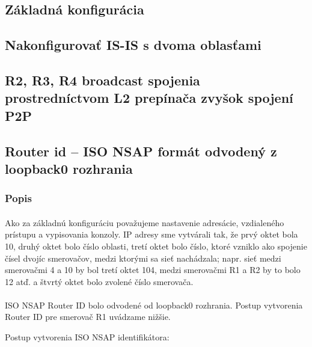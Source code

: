 \documentclass[12pt,twoside,a4paper]{report}
\begin{document}
\subsection{Základná konfigurácia}
\subsection{Nakonfigurovať IS-IS s dvoma oblasťami}
\subsection{R2, R3, R4 broadcast spojenia prostredníctvom L2 prepínača zvyšok spojení P2P}
\subsection{Router id – ISO NSAP formát odvodený z loopback0 rozhrania}
\subsubsection{Popis}
\paragraph{}
Ako za základnú konfiguráciu považujeme nastavenie adresácie, vzdialeného prístupu a vypisovania konzoly. IP adresy sme vytvárali tak, že prvý oktet bola 10, druhý oktet bolo číslo oblasti, tretí oktet bolo číslo, ktoré vzniklo ako spojenie čísel dvojíc smerovačov, medzi ktorými sa sieť nachádzala; napr. sieť medzi smerovačmi 4 a 10 by bol tretí oktet 104, medzi smerovačmi R1 a R2 by to bolo 12 atď. a štvrtý oktet bolo zvolené číslo smerovača.

\paragraph{}
ISO NSAP Router ID bolo odvodené od loopback0 rozhrania. Postup vytvorenia Router ID pre smerovač R1 uvádzame nižšie.

Postup vytvorenia ISO NSAP identifikátora:
\end{document}
